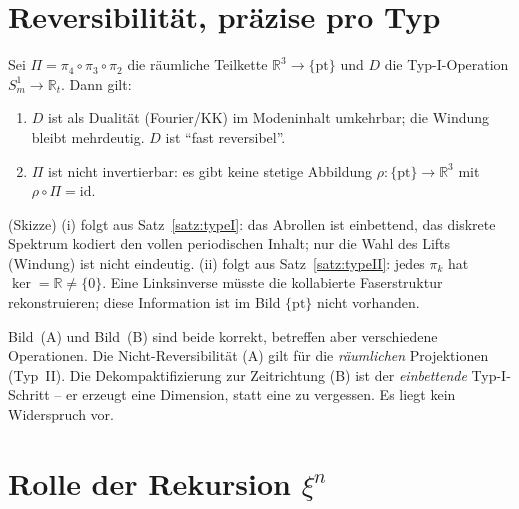 \section{Reversibilit\"at, pr\"azise pro Typ}

\begin{theorem}\label{satz:rev}
Sei $\Pi = \pi_4\circ\pi_3\circ\pi_2$ die r\"aumliche Teilkette
$\mathbb{R}^3 \to \{\mathrm{pt}\}$ und $D$ die Typ-I-Operation
$S^1_m \to \mathbb{R}_t$. Dann gilt:
\begin{enumerate}
  \item[(i)] $D$ ist als Dualit\"at (Fourier/KK) im Modeninhalt umkehrbar; die
  Windung bleibt mehrdeutig. $D$ ist ``fast reversibel''.
  \item[(ii)] $\Pi$ ist nicht invertierbar: es gibt keine stetige Abbildung
  $\rho:\{\mathrm{pt}\}\to\mathbb{R}^3$ mit $\rho\circ\Pi=\mathrm{id}$.
\end{enumerate}
\end{theorem}

\begin{beweis}
(Skizze) (i) folgt aus Satz~\ref{satz:typeI}: das Abrollen ist einbettend, das
diskrete Spektrum kodiert den vollen periodischen Inhalt; nur die Wahl des Lifts
(Windung) ist nicht eindeutig. (ii) folgt aus Satz~\ref{satz:typeII}: jedes
$\pi_k$ hat $\ker = \mathbb{R}\neq\{0\}$. Eine Linksinverse m\"usste die
kollabierte Faserstruktur rekonstruieren; diese Information ist im Bild
$\{\mathrm{pt}\}$ nicht vorhanden.
\end{beweis}

\begin{corollary}
Bild~(A) und Bild~(B) sind beide korrekt, betreffen aber verschiedene
Operationen. Die Nicht-Reversibilit\"at (A) gilt f\"ur die \emph{r\"aumlichen}
Projektionen (Typ~II). Die Dekompaktifizierung zur Zeitrichtung (B) ist der
\emph{einbettende} Typ-I-Schritt -- er erzeugt eine Dimension, statt eine zu
vergessen. Es liegt kein Widerspruch vor.
\end{corollary}

\section{Rolle der Rekursion $\xi^n$}

